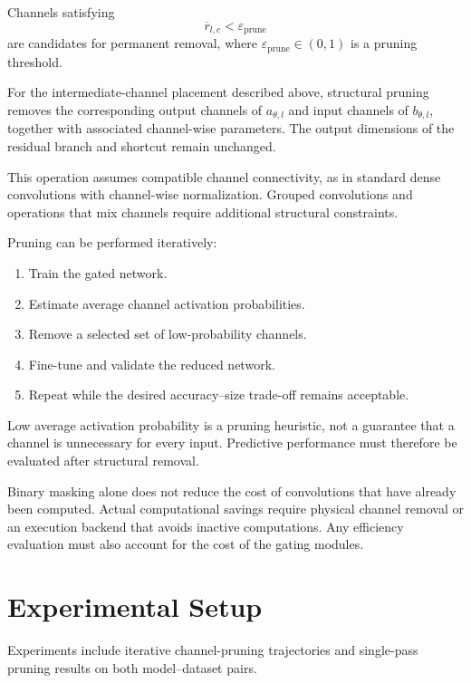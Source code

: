 \documentclass[sigplan,screen]{acmart}
\begin{document}
Channels satisfying
\begin{equation}
\overline{r}_{l,c}
<
\varepsilon_{\mathrm{prune}}
\end{equation}
are candidates for permanent removal, where
$\varepsilon_{\mathrm{prune}}\in(0,1)$ is a pruning
threshold.

For the intermediate-channel placement described above,
structural pruning removes the corresponding output
channels of $a_{\theta,l}$ and input channels of
$b_{\theta,l}$, together with associated channel-wise
parameters. The output dimensions of the residual branch
and shortcut remain unchanged.

This operation assumes compatible channel connectivity,
as in standard dense convolutions with channel-wise
normalization. Grouped convolutions and operations that
mix channels require additional structural constraints.

Pruning can be performed iteratively:
\begin{enumerate}
\item Train the gated network.
\item Estimate average channel activation probabilities.
\item Remove a selected set of low-probability channels.
\item Fine-tune and validate the reduced network.
\item Repeat while the desired accuracy--size trade-off
remains acceptable.
\end{enumerate}

Low average activation probability is a pruning heuristic,
not a guarantee that a channel is unnecessary for every
input. Predictive performance must therefore be evaluated
after structural removal.

Binary masking alone does not reduce the cost of
convolutions that have already been computed. Actual
computational savings require physical channel removal
or an execution backend that avoids inactive computations.
Any efficiency evaluation must also account for the cost
of the gating modules.




\FloatBarrier

\section{Experimental Setup}

Experiments include iterative channel-pruning trajectories and
single-pass pruning results on both model--dataset pairs.
\end{document}
